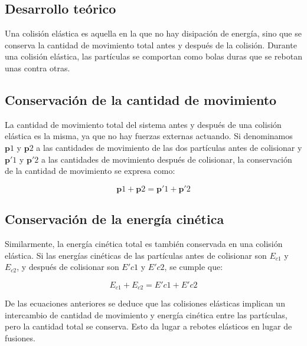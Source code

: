 \documentclass{article}
\begin{document}

\begin{multicols}{2}

\section{Desarrollo teórico}\label{Desarrollo Teorico}                              	%
Una colisión elástica es aquella en la que no hay disipación de energía, sino que se conserva la cantidad de movimiento total antes y después de la colisión. Durante una colisión elástica, las partículas se comportan como bolas duras que se rebotan unas contra otras.

\subsection{Conservación de la cantidad de movimiento}

La cantidad de movimiento total del sistema antes y después de una colisión elástica es la misma, ya que no hay fuerzas externas actuando. Si denominamos $\mathbf{p}{1}$ y $\mathbf{p}{2}$ a las cantidades de movimiento de las dos partículas antes de colisionar y $\mathbf{p}'{1}$ y $\mathbf{p}'{2}$ a las cantidades de movimiento después de colisionar, la conservación de la cantidad de movimiento se expresa como:

\begin{equation}
\mathbf{p}{1} + \mathbf{p}{2} = \mathbf{p}'{1} + \mathbf{p}'{2}
\end{equation}

\subsection{Conservación de la energía cinética}

Similarmente, la energía cinética total es también conservada en una colisión elástica. Si las energías cinéticas de las partículas antes de colisionar son $E_{c1}$ y $E_{c2}$, y después de colisionar son $E'{c1}$ y $E'{c2}$, se cumple que:

\begin{equation}
E_{c1} + E_{c2} = E'{c1} + E'{c2}
\end{equation}

De las ecuaciones anteriores se deduce que las colisiones elásticas implican un intercambio de cantidad de movimiento y energía cinética entre las partículas, pero la cantidad total se conserva. Esto da lugar a rebotes elásticos en lugar de fusiones.



\end{multicols}
\end{document}
